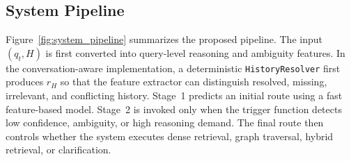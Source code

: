 \documentclass[11pt,twocolumn]{article}
\begin{document}
\subsection{System Pipeline}
\label{subsec:system_pipeline}

Figure~\ref{fig:system_pipeline} summarizes the proposed
pipeline. The input $(q_t,H)$ is first converted into
query-level reasoning and ambiguity features. In the
conversation-aware implementation, a deterministic
\texttt{HistoryResolver} first produces $r_H$ so that the
feature extractor can distinguish resolved, missing,
irrelevant, and conflicting history. Stage~1
predicts an initial route using a fast feature-based model.
Stage~2 is invoked only when the trigger function detects low
confidence, ambiguity, or high reasoning demand. The final
route then controls whether the system executes dense
retrieval, graph traversal, hybrid retrieval, or
clarification.
\end{document}
